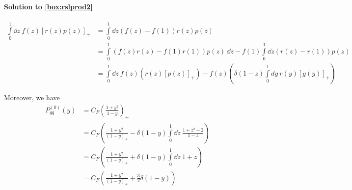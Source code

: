 \paragraph{Solution to \cref{box:rslprod2}}
\begin{align}
    \int\limits_0^1 \!\dd z~ f(z) \left[r(z)p(z)\right]_+ &= \int\limits_0^1 \dd z \left(f(z) - f(1)\right)r(z)p(z)\\
      &= \int\limits_0^1 \left(f(z)r(z) - f(1)r(1)\right)p(z)~\dd z - f(1)\int\limits_0^1\! \dd z(r(z)-r(1))p(z)\\
      &= \int\limits_0^1\! \dd z~ f(z)\left(r(z) \left[p(z)\right]_+\right) - f(z)\left(\delta(1-z)\int\limits_0^1\! dy~ r(y) \left[g(y)\right]_+\right)
\end{align}

Moreover, we have
\begin{align}
    P_{qq}^{(0)}(y) &= C_F\left( \frac{1+y^2}{1-y}\right)_+ \\
     &=C_F\left( \frac{1+y^2}{(1-y)_+} - \delta(1-y)\int\limits_0^1 \!\dd z~ \frac{1+z^2 -2}{1-z}\right)\\
     &=C_F\left( \frac{1+y^2}{(1-y)_+} + \delta(1-y)\int\limits_0^1 \!\dd z~ 1+z\right)\\
     &=C_F\left( \frac{1+y^2}{(1-y)_+} + \frac 3 2\delta(1-y)\right)
\end{align}
